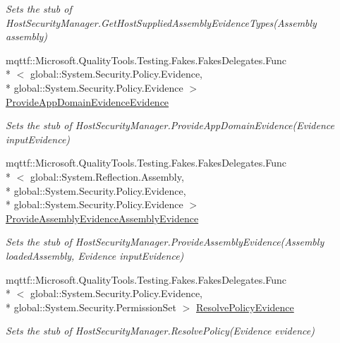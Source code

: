 \begin{DoxyCompactItemize}
\begin{DoxyCompactList}\small\item\em Sets the stub of Host\-Security\-Manager.\-Get\-Host\-Supplied\-Assembly\-Evidence\-Types(\-Assembly assembly)\end{DoxyCompactList}\item 
mqttf\-::\-Microsoft.\-Quality\-Tools.\-Testing.\-Fakes.\-Fakes\-Delegates.\-Func\\*
$<$ global\-::\-System.\-Security.\-Policy.\-Evidence, \\*
global\-::\-System.\-Security.\-Policy.\-Evidence $>$ \hyperlink{class_system_1_1_security_1_1_fakes_1_1_stub_host_security_manager_a11ef74d226b399cdf912f34c920184b9}{Provide\-App\-Domain\-Evidence\-Evidence}
\begin{DoxyCompactList}\small\item\em Sets the stub of Host\-Security\-Manager.\-Provide\-App\-Domain\-Evidence(\-Evidence input\-Evidence)\end{DoxyCompactList}\item 
mqttf\-::\-Microsoft.\-Quality\-Tools.\-Testing.\-Fakes.\-Fakes\-Delegates.\-Func\\*
$<$ global\-::\-System.\-Reflection.\-Assembly, \\*
global\-::\-System.\-Security.\-Policy.\-Evidence, \\*
global\-::\-System.\-Security.\-Policy.\-Evidence $>$ \hyperlink{class_system_1_1_security_1_1_fakes_1_1_stub_host_security_manager_ad822d1ab22c9646cd47a9d793b9e7ca7}{Provide\-Assembly\-Evidence\-Assembly\-Evidence}
\begin{DoxyCompactList}\small\item\em Sets the stub of Host\-Security\-Manager.\-Provide\-Assembly\-Evidence(\-Assembly loaded\-Assembly, Evidence input\-Evidence)\end{DoxyCompactList}\item 
mqttf\-::\-Microsoft.\-Quality\-Tools.\-Testing.\-Fakes.\-Fakes\-Delegates.\-Func\\*
$<$ global\-::\-System.\-Security.\-Policy.\-Evidence, \\*
global\-::\-System.\-Security.\-Permission\-Set $>$ \hyperlink{class_system_1_1_security_1_1_fakes_1_1_stub_host_security_manager_ac2e86820e6d815a5a87bf78ff6770d59}{Resolve\-Policy\-Evidence}
\begin{DoxyCompactList}\small\item\em Sets the stub of Host\-Security\-Manager.\-Resolve\-Policy(\-Evidence evidence)\end{DoxyCompactList}\end{DoxyCompactItemize}

